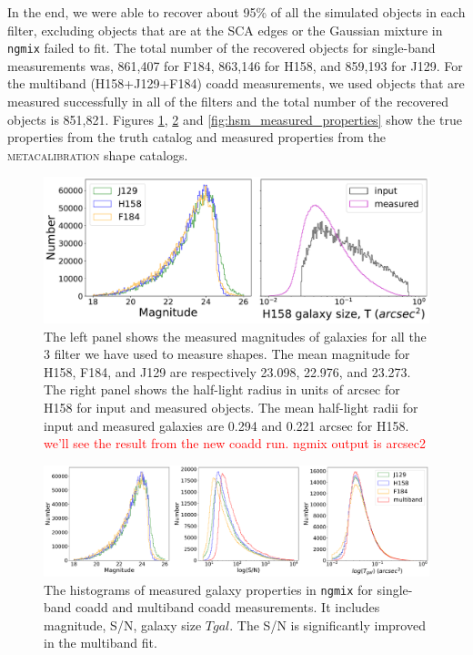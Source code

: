 \documentclass[fleqn,usenatbib]{mnras}
\begin{document}
In the end, we were able to recover about 95\% of all the simulated objects in each filter, excluding objects that are at the SCA edges or the Gaussian mixture in \texttt{ngmix} failed to fit. The total number of the recovered objects for single-band measurements was, 861,407 for F184, 863,146 for H158, and 859,193 for J129. For the multiband (H158+J129+F184) coadd measurements, we used objects that are measured successfully in all of the filters and the total number of the recovered objects is 851,821.
Figures \ref{fig:true_properties}, \ref{fig:ngmix_measured_properties} and \ref{fig:hsm_measured_properties} show the true properties from the truth catalog and measured properties from the \textsc{metacalibration} shape catalogs. 

\begin{figure}
	\includegraphics[width=\columnwidth]{true_properties.pdf}
	\centering
    \caption{The left panel shows the measured magnitudes of galaxies for all the 3 filter we have used to measure shapes. The mean magnitude for H158, F184, and J129 are respectively 23.098, 22.976, and 23.273. The right panel shows the half-light radius in units of arcsec for H158 for input and measured objects. The mean half-light radii for input and measured galaxies are 0.294 and 0.221 arcsec for H158. \textcolor{red}{we'll see the result from the new coadd run. ngmix output is arcsec2}}
    \label{fig:true_properties}
\end{figure}

\begin{figure}
    \centering
	\includegraphics[width=\textwidth]{true_ngmix_measured_properties.pdf}
    \caption{The histograms of measured galaxy properties in \texttt{ngmix} for single-band coadd and multiband coadd measurements. It includes magnitude, S/N, galaxy size $T{gal}$. The S/N is significantly improved in the multiband fit.}
    \label{fig:ngmix_measured_properties}
\end{figure}
\end{document}

